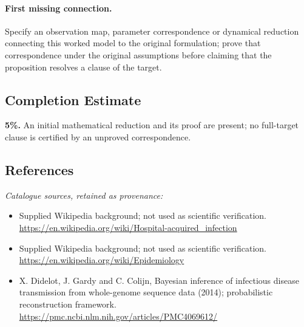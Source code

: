 \documentclass[11pt]{article}
\begin{document}
\paragraph{First missing connection.} Specify an observation map, parameter correspondence or dynamical reduction connecting this worked model to the original formulation; prove that correspondence under the original assumptions before claiming that the proposition resolves a clause of the target.
\subsection{Completion Estimate}
\textbf{5\%.} An initial mathematical reduction and its proof are present; no full-target clause is certified by an unproved correspondence.
\subsection{References}
\noindent\emph{Catalogue sources, retained as provenance:}
\begin{itemize}
\item Supplied Wikipedia background; not used as scientific verification. \url{https://en.wikipedia.org/wiki/Hospital-acquired_infection}
\item Supplied Wikipedia background; not used as scientific verification. \url{https://en.wikipedia.org/wiki/Epidemiology}
\item X. Didelot, J. Gardy and C. Colijn, Bayesian inference of infectious disease transmission from whole-genome sequence data (2014); probabilistic reconstruction framework. \url{https://pmc.ncbi.nlm.nih.gov/articles/PMC4069612/}
\end{itemize}
\clearpage


\appendix
\end{document}
